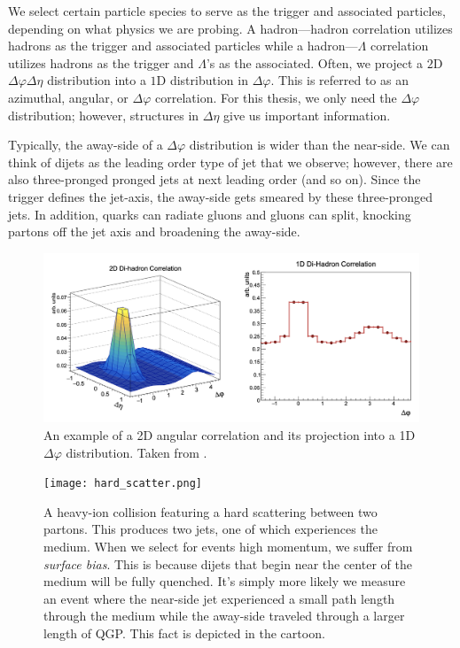 \documentclass[../main.tex]{subfiles}
\begin{document}
We select certain particle species to serve as the trigger and associated particles, depending on what physics we are probing. A hadron---hadron correlation utilizes hadrons as the trigger and associated particles while a hadron---$\Lambda$ correlation utilizes hadrons as the trigger and $\Lambda$'s as the associated. Often, we project a $2$D $\Delta\varphi\Delta\eta$ distribution into a $1$D distribution in $\Delta\varphi$. This is referred to as an azimuthal, angular, or $\Delta \varphi$ correlation. For this thesis, we only need the $\Delta\varphi$ distribution; however, structures in $\Delta\eta$ give us important information. 

Typically, the away-side of a $\Delta\varphi$ distribution is wider than the near-side. We can think of dijets as the leading order type of jet that we observe; however, there are also three-pronged pronged jets at next leading order (and so on). Since the trigger defines the jet-axis, the away-side gets smeared by these three-pronged jets. In addition, quarks can radiate gluons and gluons can split, knocking partons off the jet axis and broadening the away-side. 


\begin{figure}
    \centering
    \includegraphics[scale=0.2]{analysis/figs/2dcorr.png}
    \caption{An example of a 2D angular correlation and its projection into a 1D $\Delta\varphi$ distribution. Taken from \cite{Blair:2023rli}.}
    \label{fig:2dcorr}
\end{figure}



\begin{figure}
    \centering
    \texttt{[image: hard\_scatter.png]}
    \caption{A heavy-ion collision featuring a hard scattering between two partons. This produces two jets, one of which experiences the medium. When we select for events high momentum, we suffer from \textit{surface bias}. This is because dijets that begin near the center of the medium will be fully quenched. It's simply more likely we measure an event where the near-side jet experienced a small path length through the medium while the away-side traveled through a larger length of QGP. This fact is depicted in the cartoon.}
    \label{fig:angular_origins}
\end{figure}
\end{document}
